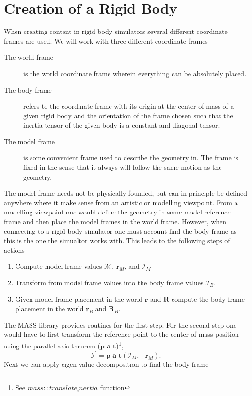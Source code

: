 \documentclass[twocolumn]{article}
\renewcommand{\vec}[1]{ \ensuremath{\mathbf{#1} } }
\newcommand{\mat}[1]{\ensuremath{\mathbf{#1} }}
\newcommand{\inertia}{\ensuremath{\mathcal{I} }}
\newcommand{\mass}{\ensuremath{\mathcal{M} }}
\begin{document}
\section*{Creation of a Rigid Body}
When creating content in rigid body simulators several different coordinate
frames are used. We will work with three different coordinate frames
\begin{description}
\item[The world frame] is the world coordinate frame wherein everything can be
  absolutely placed.
\item[The body frame ] refers to the coordinate frame with its origin at the
  center of mass of a given rigid body and the orientation of the frame chosen
  such that the inertia tensor of the given body is a constant and diagonal
  tensor.
\item[The model frame] is some convenient frame used to describe the geometry
  in. The frame is fixed in the sense that it always will follow the same motion
  as the geometry.
\end{description}
The model frame needs not be physically founded, but can in principle be defined
anywhere where it make sense from an artistic or modelling viewpoint. From a
modelling viewpoint one would define the geometry in some model reference frame
and then place the model frames in the world frame. However, when connecting to
a rigid body simulator one must account find the body frame as this is the one
the simualtor works with. This leads to the following steps of actions
\begin{enumerate}
\item Compute model frame values $\mass$, $\vec r_M$, and $\inertia_M$
\item Transform from model frame values into the body frame values $\inertia_B$.
\item Given model frame placement in the world $\vec r$ and $\mat R$ compute the
  body frame placement in the world $\vec r_B$ and $\mat R_B$.
\end{enumerate}
The MASS library provides routines for the first step. For the second step one
would have to first transform the reference point to the center of mass position
using the parallel-axis theorem ($\textbf{p-a-t}$)\footnote{See
  $mass::translate_inertia$ function},
\begin{equation}
  \inertia^\prime = \textbf{p-a-t}(\inertia_M, - \vec   r_M) .
\end{equation}
Next we can apply eigen-value-decomposition to find the body frame
\end{document}
